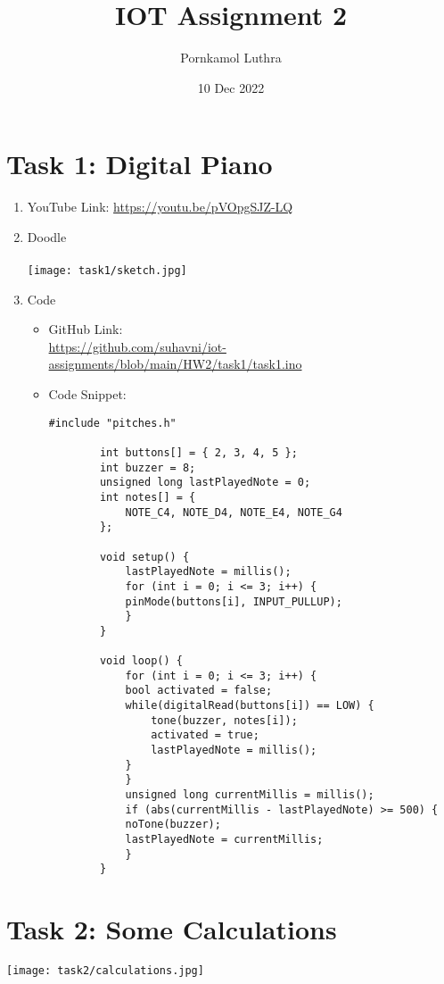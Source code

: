 \documentclass[12pt]{article}
\title{IOT Assignment 2}
\author{Pornkamol Luthra}
\date{10 Dec 2022}
\begin{document}
\maketitle

\section*{Task 1: Digital Piano}

\begin{enumerate}
	\item YouTube Link: \href{https://youtu.be/pVOpgSJZ-LQ}{https://youtu.be/pVOpgSJZ-LQ}
	\item Doodle \\\\
		\texttt{[image: task1/sketch.jpg]}
		\newpage
	\item Code
		\begin{itemize}
			\item GitHub Link:\\ 
				\href{https://github.com/suhavni/iot-assignments/blob/main/HW2/task1/task1.ino}{https://github.com/suhavni/iot-assignments/blob/main/HW2/task1/task1.ino}
			\item Code Snippet:
				\begin{lstlisting}[language=Arduino]
		#include "pitches.h"

		int buttons[] = { 2, 3, 4, 5 };
		int buzzer = 8;
		unsigned long lastPlayedNote = 0;
		int notes[] = {
			NOTE_C4, NOTE_D4, NOTE_E4, NOTE_G4
		};
		
		void setup() {
			lastPlayedNote = millis();
			for (int i = 0; i <= 3; i++) {
			pinMode(buttons[i], INPUT_PULLUP);
			}
		}
		
		void loop() {
			for (int i = 0; i <= 3; i++) {
			bool activated = false;
			while(digitalRead(buttons[i]) == LOW) {
				tone(buzzer, notes[i]);
				activated = true;
				lastPlayedNote = millis();
			}
			}
			unsigned long currentMillis = millis();
			if (abs(currentMillis - lastPlayedNote) >= 500) {
			noTone(buzzer);
			lastPlayedNote = currentMillis;
			}
		}					
				\end{lstlisting}
	\end{itemize}
\end{enumerate}

\section*{Task 2: Some Calculations}
\texttt{[image: task2/calculations.jpg]}
\end{document}
